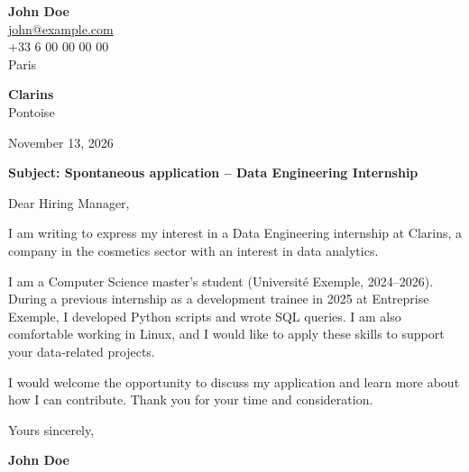 \documentclass[11pt,a4paper]{article}
\begin{document}
{\Large\bfseries John Doe}\\[0.3cm]


\href{mailto:john@example.com}{john@example.com}\\



+33 6 00 00 00 00\\



Paris\\


\vspace{1cm}

\begin{flushright}

\textbf{Clarins}\\



Pontoise\\


\vspace{0.5cm}

November 13, 2026

\end{flushright}

\vspace{0.8cm}

\textbf{Subject: Spontaneous application – Data Engineering Internship}

\vspace{0.6cm}


Dear Hiring Manager,


\vspace{0.5cm}

\justifying


I am writing to express my interest in a Data Engineering internship at Clarins, a company in the cosmetics sector with an interest in data analytics.

\par

I am a Computer Science master's student (Université Exemple, 2024–2026). During a previous internship as a development trainee in 2025 at Entreprise Exemple, I developed Python scripts and wrote SQL queries. I am also comfortable working in Linux, and I would like to apply these skills to support your data-related projects.

\par

I would welcome the opportunity to discuss my application and learn more about how I can contribute. Thank you for your time and consideration.

\par


\vspace{0.7cm}


Yours sincerely,


\vspace{0.5cm}

\textbf{John Doe}
\end{document}
